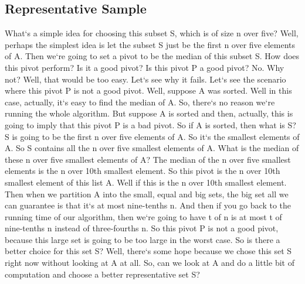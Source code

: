\subsection{Representative Sample}
What`s a simple idea for choosing this subset S, which is of size n over five? Well, perhaps the simplest idea is let the subset S just be the first n over five elements of A\@.
Then we`re going to set a pivot to be the median of this subset S\@.
How does this pivot perform? Is it a good pivot? Is this pivot P a good pivot? No.
Why not? Well, that would be too easy.
Let`s see why it fails.
Let`s see the scenario where this pivot P is not a good pivot.
Well, suppose A was sorted.
Well in this case, actually, it`s easy to find the median of A\@.
So, there`s no reason we`re running the whole algorithm.
But suppose A is sorted and then, actually, this is going to imply that this pivot P is a bad pivot.
So if A is sorted, then what is S? S is going to be the first n over five elements of A\@.
So it`s the smallest elements of A\@.
So S contains all the n over five smallest elements of A\@.
What is the median of these n over five smallest elements of A? The median of the n over five smallest elements is the n over 10th smallest element.
So this pivot is the n over 10th smallest element of this list A\@.
Well if this is the n over 10th smallest element.
Then when we partition A into the small, equal and big sets, the big set all we can guarantee is that it`s at most nine-tenths n.
And then if you go back to the running time of our algorithm, then we`re going to have t of n is at most t of nine-tenths n instead of three-fourths n.
So this pivot P is not a good pivot, because this large set is going to be too large in the worst case.
So is there a better choice for this set S? Well, there`s some hope because we chose this set S right now without looking at A at all.
So, can we look at A and do a little bit of computation and choose a better representative set S?

